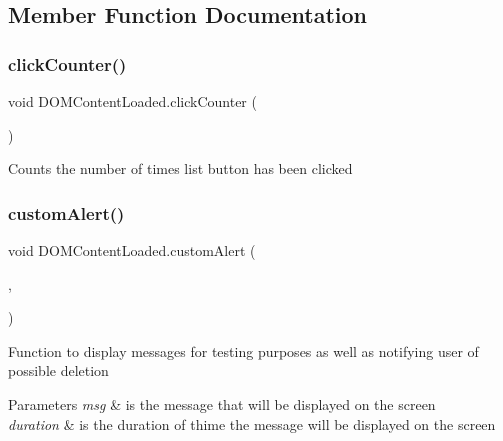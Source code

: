 \subsection{Member Function Documentation}
\mbox{\label{class_d_o_m_content_loaded_a3ada13c27e30a7921dc6de3d0928b8d6}} 
\subsubsection{\texorpdfstring{click\+Counter()}{clickCounter()}}
{\footnotesize\ttfamily void D\+O\+M\+Content\+Loaded.\+click\+Counter (\begin{DoxyParamCaption}{ }\end{DoxyParamCaption})\hspace{0.3cm}{\ttfamily [inline]}}

Counts the number of times list button has been clicked \mbox{\label{class_d_o_m_content_loaded_ab11d12ac2eac7f2fce7f06c31917594e}} 
\subsubsection{\texorpdfstring{custom\+Alert()}{customAlert()}}
{\footnotesize\ttfamily void D\+O\+M\+Content\+Loaded.\+custom\+Alert (\begin{DoxyParamCaption}\item[{msg}]{,  }\item[{duration}]{ }\end{DoxyParamCaption})\hspace{0.3cm}{\ttfamily [inline]}}

Function to display messages for testing purposes as well as notifying user of possible deletion 
\begin{DoxyParams}{Parameters}
{\em msg} & is the message that will be displayed on the screen \\
\hline
{\em duration} & is the duration of thime the message will be displayed on the screen \\
\hline
\end{DoxyParams}
\mbox{\label{class_d_o_m_content_loaded_a838d84f4bc0238418ceee1cc4bffd1ea}} 
